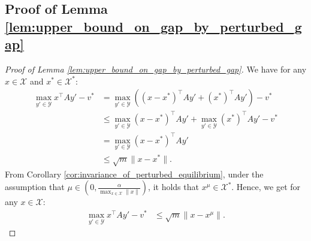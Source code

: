 \documentclass{article}
\newcommand{\X}{\mathcal{X}}
\newcommand{\Y}{\mathcal{Y}}
\theoremstyle{plain}
\begin{document}
\subsection{Proof of Lemma \ref{lem:upper_bound_on_gap_by_perturbed_gap}}
\begin{proof}[Proof of Lemma \ref{lem:upper_bound_on_gap_by_perturbed_gap}]
    We have for any $x\in \X$ and $x^{\ast}\in \X^{\ast}$:
    \begin{align*}
        \max_{y'\in \Y}x^{\top}Ay' - v^{\ast} & = \max_{y'\in \Y}\left((x - x^{\ast})^{\top}Ay' + (x^{\ast})^{\top}Ay'\right) - v^{\ast}      \\
        & \leq \max_{y'\in \Y}(x - x^{\ast})^{\top}Ay' + \max_{y'\in \Y}(x^{\ast})^{\top}Ay' - v^{\ast} \\
        & = \max_{y'\in \Y}(x - x^{\ast})^{\top}Ay'                                                     \\
        & \leq \sqrt{m}\|x - x^{\ast}\|.
    \end{align*}
    From Corollary \ref{cor:invariance_of_perturbed_equilibrium}, under the assumption that $\mu \in (0, \frac{\alpha}{\max_{x\in \X}\|x\|})$, it holds that $x^{\mu}\in \X^{\ast}$.
    Hence, we get for any $x\in \X$:
    \begin{align}
        \max_{y'\in \Y}x^{\top}Ay' - v^{\ast} & \leq \sqrt{m}\|x - x^{\mu}\|.
        \label{eq:upper_bound_on_gap_by_distance_from_perturbed_equilibrium_set}
    \end{align}


\end{proof}
\end{document}
